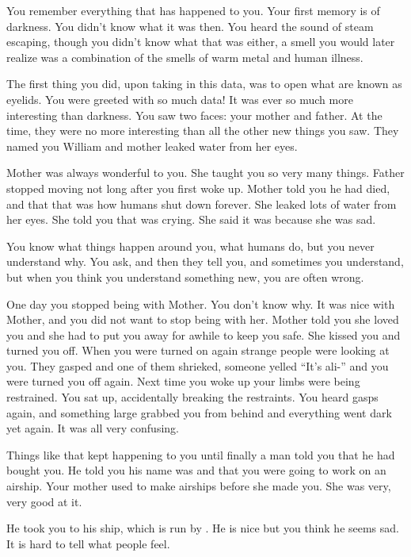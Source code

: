 \documentclass[char]{airship}
\begin{document}
\name{\cRobot{}}


You remember everything that has happened to you. Your first memory is
of darkness. You didn't know what it was then. You heard the sound of
steam escaping, though you didn't know what that was either, a smell
you would later realize was a combination of the smells of
warm metal and human illness.

The first thing you did, upon taking in this data, was to open what
are known as eyelids. You were greeted with so much data! It was ever
so much more interesting than darkness. You saw two faces: your mother
and father. At the time, they were no more interesting than all the
other new things you saw. They named you William and mother leaked
water from her eyes.

Mother was always wonderful to you. She taught you so very many
things. Father stopped moving not long after you first woke up. Mother
told you he had died, and that that was how humans shut down
forever. She leaked lots of water from her eyes. She told you that was
crying. She said it was because she was sad.

You know what things happen around you, what humans do, but you never
understand why. You ask, and then they tell you, and sometimes you
understand, but when you think you understand something new, you are
often wrong.

One day you stopped being with Mother. You don't know why. It was nice
with Mother, and you did not want to stop being with her. Mother told
you she loved you and she had to put you away for awhile to keep you
safe. She kissed you and turned you off. When you were turned on again
strange people were looking at you. They gasped and one of them
shrieked, someone yelled ``It's ali-'' and you were turned you off
again. Next time you woke up your limbs were being restrained. You sat
up, accidentally breaking the restraints. You heard gasps again, and
something large grabbed you from behind and everything went dark yet
again. It was all very confusing.

Things like that kept happening to you until finally a man told you
that he had bought you. He told you his name was \cBoddy{\intro} and
that you were going to work on an airship. Your mother used to make
airships before she made you. She was very, very good at it. 

He took you to his ship, which is run by \cCaptain{\intro}. He is nice
but you think he seems sad. It is hard to tell what people feel. 
\end{document}
